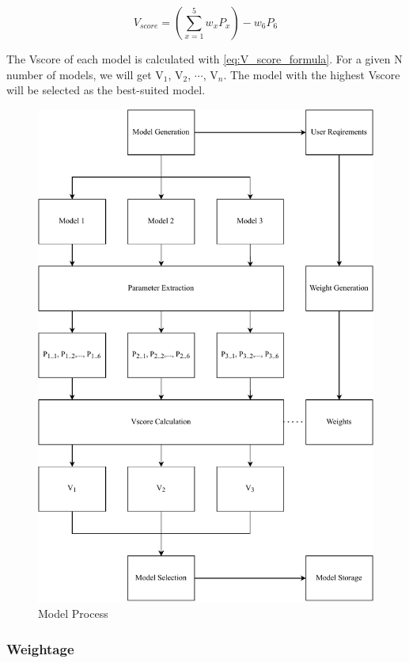 \documentclass[a4paper,fleqn]{cas-dc}
\begin{document}
\begin{equation}\label{eq:V_score_formula}
    V_{score} = \left(\sum_{x=1}^5 w_xP_x\right) - w_6P_6
\end{equation}

The Vscore of each model is calculated with \cref{eq:V_score_formula}. For a given N number of models, we will get V$_1$, V$_2$, $\cdots$, V$_n$. The model with the highest Vscore will be selected as the best-suited model.

\begin{figure}[ht]
    \centering
    \includegraphics[width=1.6\columnwidth]{math_model_relaxed_flow.pdf}
    \caption{Model Process}
    \label{fig:model_process}
\end{figure}

\subsubsection*{Weightage}\label{subsubsec:weightage}
\end{document}
